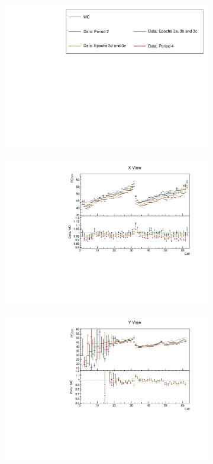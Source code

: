 \documentclass[12pt,a4paper]{article}
\begin{document}
\begin{figure}[!ht]
  \begin{subfigure}{\textwidth}
  \centering
    \includegraphics[height=0.2\linewidth]{essentialsec_tb/legend.pdf}
  \end{subfigure}
  \vspace*{2mm}

  \begin{subfigure}{0.5\textwidth}
    \includegraphics[width=\linewidth]{essentialsec_tb/pecm_cell_x.pdf}
  \end{subfigure}
  \begin{subfigure}{0.5\textwidth}
    \includegraphics[width=\linewidth]{essentialsec_tb/pecm_cell_y.pdf}

\end{subfigure}
\end{figure}
\end{document}
